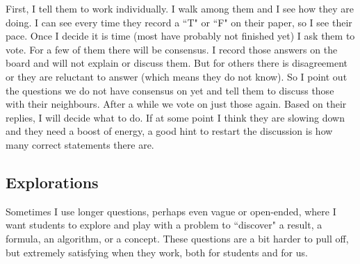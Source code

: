 \documentclass[11pt]{article}
\begin{document}
\begin{example}
\begin{question}
\end{question}

\begin{comments}
First, I tell them to work individually.  I walk among them and I see how they are doing.  I can see every time they record a ``T" or ``F" on their paper, so I see their pace.  Once I decide it is time (most have probably not finished yet) I ask them to vote. 
For a few of them there will be consensus.  I record those answers on the board and will not explain or discuss them.  But for others there is disagreement or they are reluctant to answer (which means they do not know).  So I point out the questions we do not have consensus on yet and tell them to discuss those with their neighbours.  After a while we vote on just those again.   Based on their replies, I will decide what to do.
If at some point I think they are slowing down and they need a boost of energy, a good hint to restart the discussion is how many correct statements there are.

\end{comments}

\end{example}

\newpage

\subsection{Explorations}

Sometimes I use longer questions, perhaps even vague or open-ended, where I want students to explore and play with a problem to ``discover" a result, a formula, an algorithm, or a concept.   These questions are a bit harder to pull off, but extremely satisfying when they work, both for students and for us.
\end{document}

